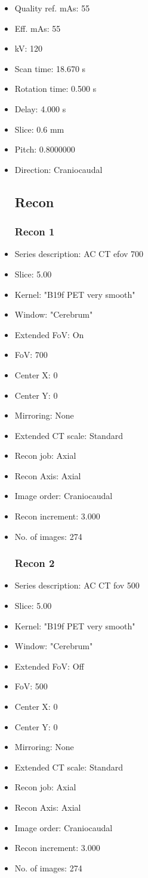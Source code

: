 \documentclass[12pt]{article}
\begin{document}
\begin{itemize}
\subsection{Scan}
\item Quality ref. mAs: 55\item Eff. mAs: 55\item kV: 120\item Scan time: 18.670 s\item Rotation time: 0.500 s\item Delay: 4.000 s\item Slice: 0.6 mm\item Pitch: 0.8000000\item Direction: Craniocaudal
\subsection{Recon}

\subsubsection{Recon 1}
\item Series description: AC CT efov 700
\item Slice: 5.00
\item Kernel: "B19f PET very smooth"
\item Window: "Cerebrum"
\item Extended FoV: On
\item FoV: 700
\item Center X: 0
\item Center Y: 0
\item Mirroring: None
\item Extended CT scale: Standard
\item Recon job: Axial
\item Recon Axis: Axial
\item Image order: Craniocaudal
\item Recon increment: 3.000
\item No. of images: 274
\subsubsection{Recon 2}
\item Series description: AC CT fov 500
\item Slice: 5.00
\item Kernel: "B19f PET very smooth"
\item Window: "Cerebrum"
\item Extended FoV: Off
\item FoV: 500
\item Center X: 0
\item Center Y: 0
\item Mirroring: None
\item Extended CT scale: Standard
\item Recon job: Axial
\item Recon Axis: Axial
\item Image order: Craniocaudal
\item Recon increment: 3.000
\item No. of images: 274

\end{itemize}
\end{document}
